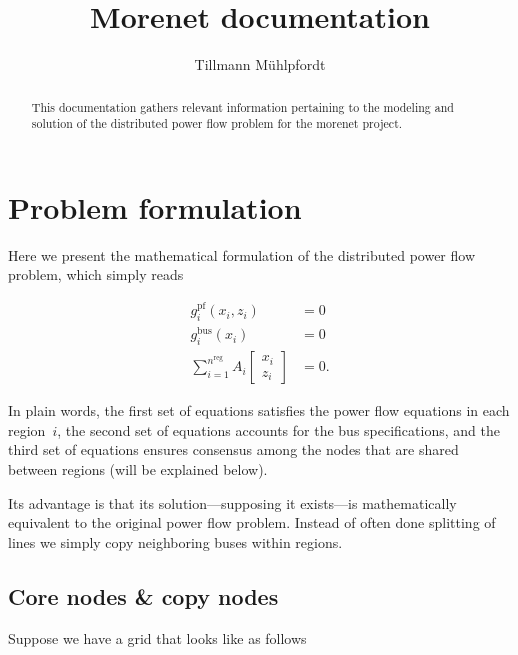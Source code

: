 \documentclass{article}
\title{Morenet documentation}
\author{Tillmann Mühlpfordt}
\newcommand{\n}{n}
\newcommand{\nregions}{\n^{\text{reg}}}
\newcommand{\stateCore}{x}
\newcommand{\stateCopy}{z}
\newcommand{\pf}{g^{\text{pf}}}
\newcommand{\busspecs}{g^{\text{bus}}}
\begin{document}
\maketitle

\begin{abstract}
This documentation gathers relevant information pertaining to the modeling and solution of the distributed power flow problem for the morenet project.
\end{abstract}

\section{Problem formulation}
Here we present the mathematical formulation of the distributed power flow problem, which simply reads

\begin{subequations}
    \begin{align}
        \pf_i( \stateCore_i, \stateCopy_i ) &= 0 \\
        \busspecs_i ( \stateCore_i ) &= 0 \\
        \sum_{i = 1}^{\nregions} A_i \begin{bmatrix}
            \stateCore_i \\
            \stateCopy_i
        \end{bmatrix}
        &= 0.
    \end{align}
\end{subequations}

In plain words, the first set of equations satisfies the power flow equations in each region~$i$, the second set of equations accounts for the bus specifications, and the third set of equations ensures consensus among the nodes that are shared between regions (will be explained below).

Its advantage is that its solution---supposing it exists---is mathematically equivalent to the original power flow problem.
Instead of often done splitting of lines we simply copy neighboring buses within regions.

\subsection{Core nodes \& copy nodes}

Suppose we have a grid that looks like as follows
\end{document}
